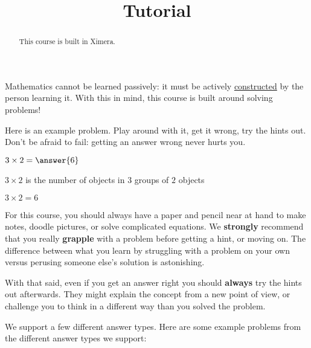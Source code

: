 \documentclass{ximera}
\title{Tutorial}
\begin{document}
\begin{abstract}
  This course is built in Ximera.
\end{abstract}\maketitle

Mathematics cannot be learned passively: it must be actively
\href{http://en.wikipedia.org/wiki/Constructivism_(philosophy_of_education)}{constructed}
by the person learning it.  With this in mind, this course
is built around solving problems!

Here is an example problem.  Play around with it, get it wrong, try
the hints out.  Don't be afraid to fail: getting an answer wrong never
hurts you.

\begin{problem}
    $3\times 2 = \answer{6}$
   
    \begin{hint}
      $3 \times 2$ is the number of objects in $3$ groups of $2$ objects
    \end{hint}
    \begin{hint}
    \end{hint}
    \begin{hint}
      $3\times 2=6$
    \end{hint}
\end{problem}

For this course, you should always have a paper and pencil near at
hand to make notes, doodle pictures, or solve complicated equations.
We \textbf{strongly} recommend that you really \textbf{grapple} with a
problem before getting a hint, or moving on.  The difference between
what you learn by struggling with a problem on your own versus
perusing someone else's solution is astonishing.

With that said, even if you get an answer right you should \textbf{always} try the
hints out afterwards.  They might explain the concept from a new point
of view, or challenge you to think in a different way than you solved
the problem.


We support a few different answer types. Here are some example
problems from the different answer types we support:
\end{document}

